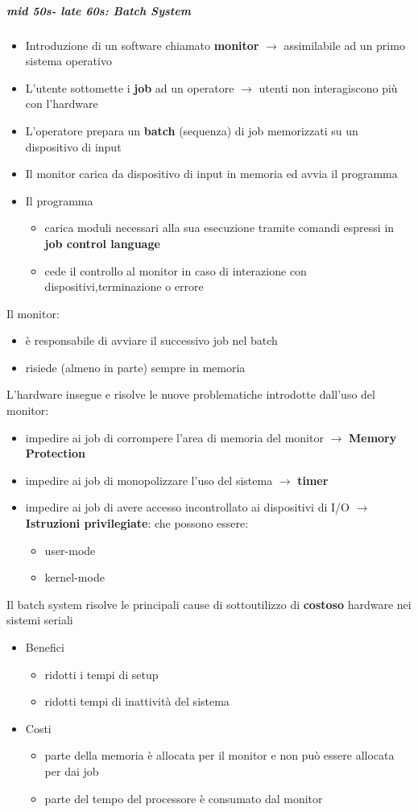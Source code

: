 \subparagraph{mid 50s- late 60s: Batch System}
\begin{itemize}
\item Introduzione di un software chiamato \textbf{monitor} $\rightarrow$ assimilabile ad un primo sistema operativo
\item L'utente sottomette i \textbf{job} ad un operatore $\rightarrow$ utenti non interagiscono più con l'hardware
\item L'operatore prepara un \textbf{batch} (sequenza) di job memorizzati su un dispositivo di input
\item Il monitor carica da dispositivo di input in memoria ed avvia il programma
\item Il programma \begin{itemize}
\item carica moduli necessari alla sua esecuzione tramite comandi espressi in \textbf{job control language}
\item cede il controllo al monitor in caso di interazione con dispositivi,terminazione o errore
\end{itemize}
\end{itemize}
Il monitor:\begin{itemize}
\item è responsabile di avviare il successivo job nel batch
\item risiede (almeno in parte) sempre in memoria
\end{itemize}
L'hardware insegue e risolve le nuove problematiche introdotte dall'uso del monitor: \begin{itemize}
\item impedire ai job di corrompere l'area di memoria del monitor $\rightarrow$ \textbf{Memory Protection}
\item impedire ai job di monopolizzare l'uso del sistema $\rightarrow$ \textbf{timer}
\item impedire ai job di avere accesso incontrollato ai dispositivi di I/O $\rightarrow$ \textbf{Istruzioni privilegiate}: che possono essere: \begin{itemize}
\item user-mode
\item kernel-mode
\end{itemize}
\end{itemize}
Il batch system risolve le principali cause di sottoutilizzo di \textbf{costoso} hardware nei sistemi seriali
\begin{itemize}
\item Benefici 
 \begin{itemize}
 \item ridotti i tempi di setup
 \item ridotti tempi di inattività del sistema
 \end{itemize}
\item Costi
 \begin{itemize}
 \item parte della memoria è allocata per il monitor e non può essere allocata per dai job
 \item parte del tempo del processore è consumato dal monitor
 \end{itemize}
\end{itemize}
